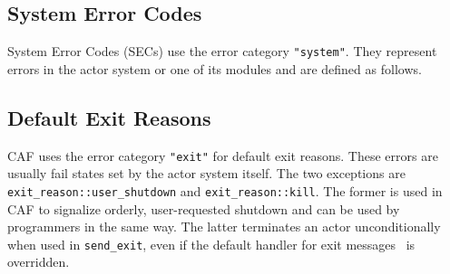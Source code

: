 
\clearpage
\subsection{System Error Codes}
\label{sec}

System Error Codes (SECs) use the error category \lstinline^"system"^. They
represent errors in the actor system or one of its modules and are defined as
follows.


\subsection{Default Exit Reasons}
\label{exit-reason}

CAF uses the error category \lstinline^"exit"^ for default exit reasons. These
errors are usually fail states set by the actor system itself. The two
exceptions are \lstinline^exit_reason::user_shutdown^ and
\lstinline^exit_reason::kill^. The former is used in CAF to signalize orderly,
user-requested shutdown and can be used by programmers in the same way. The
latter terminates an actor unconditionally when used in \lstinline^send_exit^,
even if the default handler for exit messages~ is overridden.

